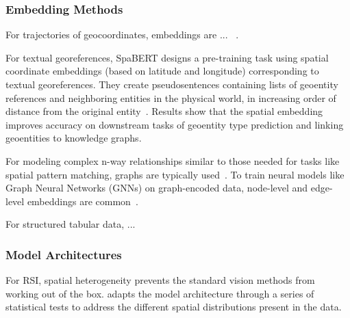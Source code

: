 \subsubsection{Embedding Methods}
For trajectories of geocoordinates, embeddings are ... ~\cite{Hu2023}.

For textual georeferences, SpaBERT designs a pre-training task using spatial coordinate embeddings (based on latitude and longitude) corresponding to textual georeferences.
They create pseudosentences containing lists of geoentity references and neighboring entities in the physical world, in increasing order of distance from the original entity~\cite{Li2021}.
Results show that the spatial embedding improves accuracy on downstream tasks of geoentity type prediction and linking geoentities to knowledge graphs.

For modeling complex n-way relationships similar to those needed for tasks like spatial pattern matching, graphs are typically used~\cite{Folkers2000, Chen2019, Fang2019, Osul2023b}.
To train neural models like Graph Neural Networks (GNNs) on graph-encoded data, node-level and edge-level embeddings are common~\cite{Bai2019,Krlevza2016,Liu2020Neural}. 
%

For structured tabular data, ... 
\cite{Iida2021, Somepalli2022, Seng2022, Yin2020, Herzig2020}

\subsubsection{Model Architectures}
For RSI, spatial heterogeneity prevents the standard vision methods from working out of the box. 
\cite{Xie2021} adapts the model architecture through a series of statistical tests to address the different spatial distributions present in the data.






